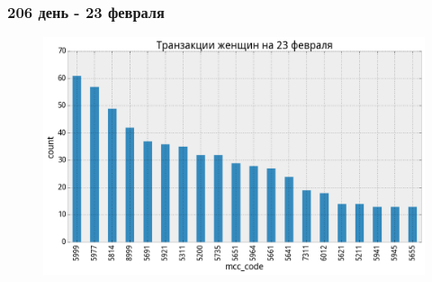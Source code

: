 \documentclass{beamer}
\begin{document}
\begin{frame}
\frametitle{206 день - 23 февраля}

\begin{figure}
    \includegraphics[width=1\linewidth]{pics/women_23feb.png}
\end{figure}

\end{frame}

\end{document}
